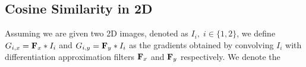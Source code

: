 \subsection{Cosine Similarity in 2D}\label{subsec:cosine_2d}
Assuming we are given two 2D images, denoted as $I_i, \; i \in \{1,2\}$, we
define $G_{i,x} = \boldsymbol{\mathbf{F}}_x \ast I_i$ and $G_{i,y} = \boldsymbol{\mathbf{F}}_y \ast I_i$
as the gradients obtained by convolving $I_i$ with differentiation approximation
filters $\boldsymbol{\mathbf{F}}_x$ and $\boldsymbol{\mathbf{F}}_y$ respectively. We denote the
